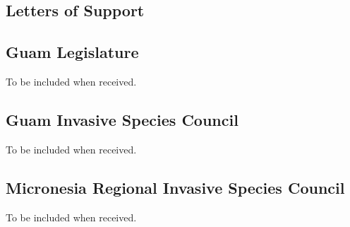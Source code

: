 \documentclass[12pt,letterpaper,english,bibliography=totocnumbered, abstract=on]{scrartcl}
\begin{document}
\begin{appendices}
\section{Letters of Support}

\subsection{Guam Legislature}
To be included when received.

\subsection{Guam Invasive Species Council}
To be included  when received.

\subsection{Micronesia Regional Invasive Species Council}
%
To be included  when received.

%
%
%
%
%
%

\end{appendices}
\end{document}
